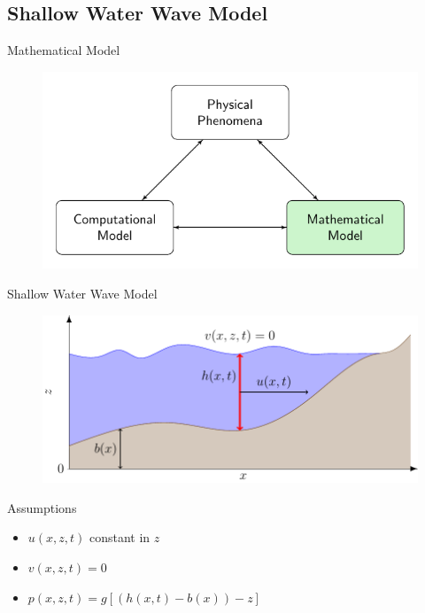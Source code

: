 \documentclass[pdf]{beamer}
\begin{document}
\subsection{Shallow Water Wave Model}
\begin{frame}{Mathematical Model}
	\begin{figure}
		\includegraphics[width=\textwidth]{./Pics/ModelDiagrams/FlowChartHigh2G.pdf}
	\end{figure}
\end{frame}
\begin{frame}{Shallow Water Wave Model}
	\begin{figure}
		\includegraphics[width=\textwidth]{./Pics/WaterModelDiagrams/SWWE.pdf}
	\end{figure}
\end{frame}
\begin{frame}{Assumptions}
	\begin{itemize}
		\item $u(x,z,t)$ constant in $z$
		\item $v(x,z,t) = 0$
		\item $p(x,z,t) = g\left[ \left(h(x,t) - b(x)\right) - z\right]$
	\end{itemize}
\end{frame}
\end{document}
